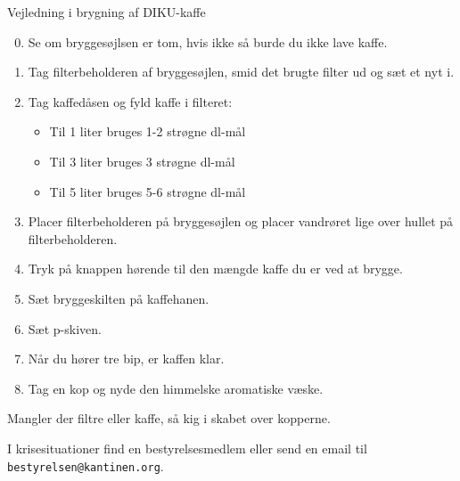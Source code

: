 \documentclass{article}
\begin{document}

\maketitle

\null
\vspace{-0.2cm}

\fontsize{18}{20}\selectfont

\vspace{-1.7cm}
\hspace{-0.9cm}\noindent Vejledning i brygning af DIKU-kaffe

\vspace{1.5cm}

\begin{enumerate}

\setcounter{enumi}{-1}

\itemsep0em

\item Se om bryggesøjlsen er tom, hvis ikke så burde du ikke lave kaffe.

\item Tag filterbeholderen af bryggesøjlen, smid det brugte filter ud og sæt et
nyt i.

\item Tag kaffedåsen og fyld kaffe i filteret:

\begin{itemize}

\bfseries

\item Til 1 liter bruges 1-2 strøgne dl-mål

\item Til 3 liter bruges 3 strøgne dl-mål

\item Til 5 liter bruges 5-6 strøgne dl-mål


\end{itemize} \normalfont

\item Placer filterbeholderen på bryggesøjlen og placer vandrøret lige over
hullet på filterbeholderen.

\item Tryk på knappen hørende til den mængde kaffe du er ved at brygge.

\item Sæt bryggeskilten på kaffehanen.

\item Sæt p-skiven.

\item Når du hører tre bip, er kaffen klar.

\item Tag en kop og nyde den himmelske aromatiske væske.

\end{enumerate}

\vspace{0.2cm}

\LARGE

\begin{center}

Mangler der filtre eller kaffe, så kig i skabet over kopperne.

I krisesituationer find en bestyrelsesmedlem eller send en email til
\texttt{bestyrelsen@kantinen.org}.

\end{center}

\underskriv
\end{document}
